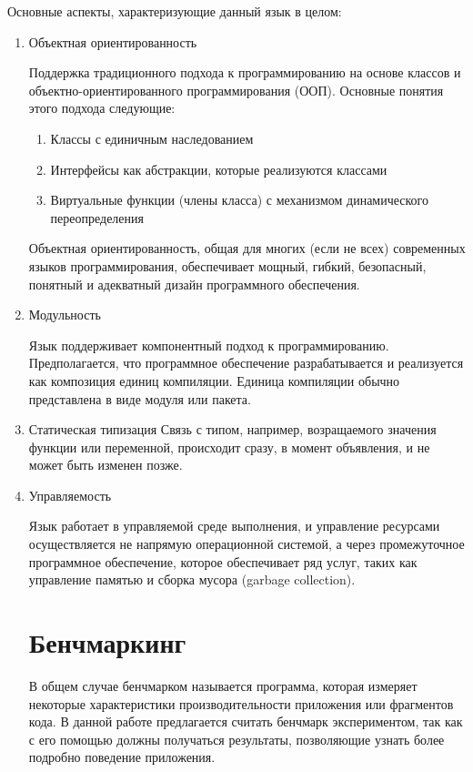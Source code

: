 \documentclass{mipt-thesis-bs}
\begin{document}
Основные аспекты, характеризующие данный язык в целом:

\begin{enumerate}
    \item Объектная ориентированность

    Поддержка традиционного подхода к программированию на основе классов и
    объектно-ориентированного программирования (ООП). Основные понятия этого подхода следующие:
    \begin{enumerate}
        \item Классы с единичным наследованием
        \item Интерфейсы как абстракции, которые реализуются классами
        \item Виртуальные функции (члены класса) с механизмом динамического переопределения
    \end{enumerate}
    Объектная ориентированность, общая для многих (если не всех) современных языков программирования,
    обеспечивает мощный, гибкий, безопасный, понятный и адекватный дизайн программного обеспечения.

    \item Модульность

    Язык поддерживает компонентный подход к программированию. Предполагается, что
    программное обеспечение разрабатывается и реализуется как композиция единиц
     компиляции. Единица компиляции обычно представлена в виде модуля или пакета.

    \item Статическая типизация
    Связь с типом, например, возращаемого значения функции или переменной, происходит сразу, в момент объявления,
    и не может быть изменен позже.

    \item Управляемость

    Язык работает в управляемой среде выполнения, и управление ресурсами осуществляется не напрямую
    операционной системой, а через промежуточное программное обеспечение, которое обеспечивает ряд услуг,
    таких как управление памятью и сборка мусора (garbage collection).

\section{Бенчмаркинг}

В общем случае бенчмарком называется программа, которая измеряет некоторые характеристики
производительности приложения или фрагментов кода. В данной работе предлагается считать
бенчмарк экспериментом, так как с его помощью должны получаться результаты, позволяющие
узнать более подробно поведение приложения.


\end{enumerate}
\end{document}

